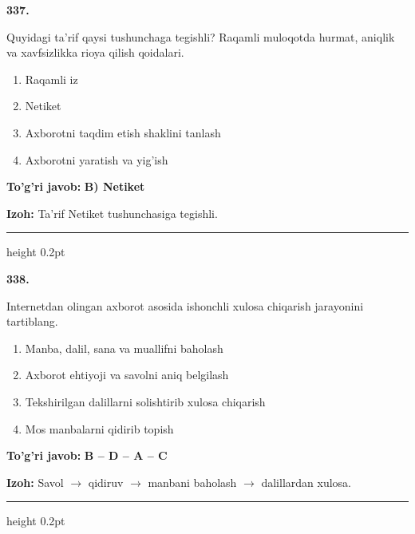 \documentclass[10pt,a4paper,oneside]{article}
\begin{document}
\noindent\textbf{\color{ink}337.}
\par
Quyidagi ta'rif qaysi tushunchaga tegishli? Raqamli muloqotda hurmat, aniqlik va xavfsizlikka rioya qilish qoidalari.
\begin{enumerate}[label=\Alph*),leftmargin=9mm]
\item Raqamli iz
\item Netiket
\item Axborotni taqdim etish shaklini tanlash
\item Axborotni yaratish va yig'ish
\end{enumerate}
\begin{tcolorbox}[enhanced,breakable,colback=teal!4,colframe=teal!50!black,boxrule=0.5pt,arc=1.1mm,left=3mm,right=3mm,top=1.7mm,bottom=1.7mm,before skip=2mm,after skip=2mm]
\textbf{\color{teal}To'g'ri javob:} \textbf{B) Netiket}
\par\smallskip
\textbf{Izoh:} Ta'rif Netiket tushunchasiga tegishli.
\end{tcolorbox}
\vspace{2mm}\hrule height 0.2pt \vspace{3mm}

\noindent\textbf{\color{ink}338.}
\par
Internetdan olingan axborot asosida ishonchli xulosa chiqarish jarayonini tartiblang.
\begin{enumerate}[label=\Alph*),leftmargin=9mm]
\item Manba, dalil, sana va muallifni baholash
\item Axborot ehtiyoji va savolni aniq belgilash
\item Tekshirilgan dalillarni solishtirib xulosa chiqarish
\item Mos manbalarni qidirib topish
\end{enumerate}
\begin{tcolorbox}[enhanced,breakable,colback=teal!4,colframe=teal!50!black,boxrule=0.5pt,arc=1.1mm,left=3mm,right=3mm,top=1.7mm,bottom=1.7mm,before skip=2mm,after skip=2mm]
\textbf{\color{teal}To'g'ri javob:} \textbf{B -- D -- A -- C}
\par\smallskip
\textbf{Izoh:} Savol \ensuremath{\to} qidiruv \ensuremath{\to} manbani baholash \ensuremath{\to} dalillardan xulosa.
\end{tcolorbox}
\vspace{2mm}\hrule height 0.2pt \vspace{3mm}
\end{document}
